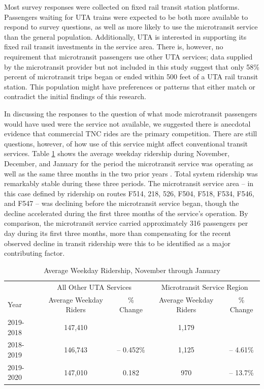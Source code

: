 \documentclass[smartcities,article,submit,moreauthors,pdftex]{Definitions/mdpi}
\begin{document}
Most survey responses were collected on fixed rail transit station platforms. Passengers waiting for UTA trains were expected to be both more available to respond to survey questions, as well as more likely to use the microtransit service than the general population. Additionally, UTA is interested in supporting its fixed rail transit investments in the service area. There is, however, no requirement that microtransit passengers use other UTA services; data supplied by the microtransit provider but not included in this study suggest that only 58\% percent of microtransit trips began or ended within 500 feet of a UTA rail transit station. This population might have preferences or patterns that either match or contradict the initial findings of this research.

In discussing the responses to the question of what mode microtransit passengers would have used were the service not available, we suggested there is anecdotal evidence that commercial TNC rides are the primary competition. There are still questions, however, of how use of this service might affect conventional transit services. Table \ref{tab:uta-ridership} shows the average weekday ridership during November, December, and January for the period the microtransit service was operating as well as the same three months in the two prior years \citet{uta2020boardings}. Total system ridership was remarkably stable during these three periods. The microtransit service area – in this case defined by ridership on routes F514, 218, 526, F504, F518, F534, F546, and F547 – was declining before the microtransit service began, though the decline accelerated during the first three months of the service’s operation. By comparison, the microtransit service carried approximately 316 passengers per day during its first three months, more than compensating for the recent observed decline in transit ridership were this to be identified as a major contributing factor.

\begin{table}[ht]
    \centering
    \renewcommand{\arraystretch}{1.5}
    \caption{Average Weekday Ridership, November through January}
    \label{tab:uta-ridership}
    \begin{tabular}{@{}lcccc@{}}
\toprule
          & \multicolumn{2}{c}{All   Other UTA Services} & \multicolumn{2}{c}{Microtransit   Service Region} \\
          \cmidrule(l){2-3} \cmidrule(l){4-5}
Year      & Average   Weekday Riders    & \%   Change    & Average   Weekday Riders    & \%   Change\\
\midrule
2019-2018 & 147,410                     &                & 1,179                       &            \\
2018-2019 & 146,743                     & –   0.452\%    & 1,125                       & –   4.61\% \\
2019-2020 & 147,010                     & 0.182          & 970                         & –   13.7\% \\
\bottomrule
\end{tabular}
\end{table}
\end{document}
